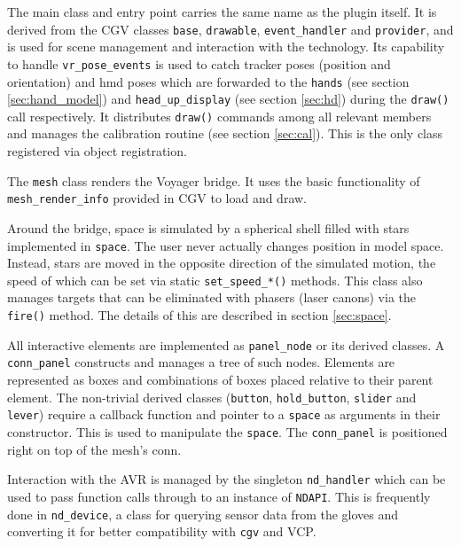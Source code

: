 \documentclass[hyperref, bachelorofscience]{cgvpub}
\begin{document}
The main class and entry point carries the same name as the plugin itself. It is derived from the \gls{CGV} classes \lstinline|base|, \lstinline|drawable|, \lstinline|event_handler| and \lstinline|provider|, and is used for scene management and interaction with the technology. Its capability to handle \lstinline|vr_pose_events| is used to catch tracker poses (position and orientation) and \acrshort{hmd} poses which are forwarded to the \lstinline|hands| (see section \ref{sec:hand_model}) and \lstinline|head_up_display| (see section \ref{sec:hd}) during the \lstinline|draw()| call respectively. It distributes \lstinline|draw()| commands among all relevant members and manages the calibration routine (see section \ref{sec:cal}). This is the only class registered via object registration.

The \lstinline|mesh| class renders the Voyager bridge. It uses the basic functionality of \lstinline|mesh_render_info| provided in \gls{CGV} to load and draw.

Around the bridge, space is simulated by a spherical shell filled with stars implemented in \lstinline|space|. The user never actually changes position in model space. Instead, stars are moved in the opposite direction of the simulated motion, the speed of which can be set via static \lstinline|set_speed_*()| methods. This class also manages targets that can be eliminated with phasers (laser canons) via the \lstinline|fire()| method. The details of this are described in section \ref{sec:space}.

All interactive elements are implemented as \lstinline|panel_node| or its derived classes. A \lstinline|conn_panel| constructs and manages a tree of such nodes. Elements are represented as boxes and combinations of boxes placed relative to their parent element. The non-trivial derived classes (\lstinline|button|, \lstinline|hold_button|, \lstinline|slider| and \lstinline|lever|) require a callback function and pointer to a \lstinline|space| as arguments in their constructor. This is used to manipulate the \lstinline|space|. The \lstinline|conn_panel| is positioned right on top of the mesh's conn.

Interaction with the \Gls{AVR} is managed by the singleton \lstinline|nd_handler| which can be used to pass function calls through to an instance of \lstinline|NDAPI|. This is frequently done in \lstinline|nd_device|, a class for querying sensor data from the gloves and converting it for better compatibility with \lstinline|cgv| and \gls{VCP}.
\end{document}
